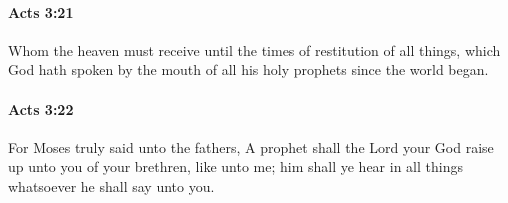 		\paragraph{Acts 3:21} %
			\label{ACTS-3-21}

			Whom the heaven must receive until the times of restitution of all things, which God hath spoken by the mouth of all his holy prophets since the world began.

			\begin{framed}
			\scriptsize
				\begin{compactdesc}
					\item[SBLG] 
				\end{compactdesc}
			\end{framed}

		\paragraph{Acts 3:22} %
			\label{ACTS-3-22}

			For Moses truly said unto the fathers, A prophet shall the Lord your God raise up unto you of your brethren, like unto me; him shall ye hear in all things whatsoever he shall say unto you.

